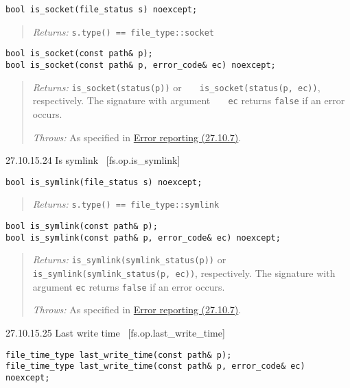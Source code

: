 \begin{verbatim}
bool is_socket(file_status s) noexcept;
\end{verbatim}

\begin{quote}
\emph{Returns:} \texttt{s.type()\ ==\ file\_type::socket}
\end{quote}

\begin{verbatim}
bool is_socket(const path& p);
bool is_socket(const path& p, error_code& ec) noexcept;
\end{verbatim}

\begin{quote}
\emph{Returns:} \texttt{is\_socket(status(p))} or
\texttt{\ \ \ is\_socket(status(p,\ ec))}, respectively. The signature
with argument \texttt{\ \ \ ec} returns \texttt{false} if an error
occurs.

\emph{Throws:} As specified in \hyperref[Error-reporting]{Error
reporting (27.10.7)}.
\end{quote}

27.10.15.24 Is symlink~ {[}fs.op.is\_symlink{]}

\begin{verbatim}
bool is_symlink(file_status s) noexcept;
\end{verbatim}

\begin{quote}
\emph{Returns:} \texttt{s.type()\ ==\ file\_type::symlink}
\end{quote}

\begin{verbatim}
bool is_symlink(const path& p);
bool is_symlink(const path& p, error_code& ec) noexcept;
\end{verbatim}

\begin{quote}
\emph{Returns:} \texttt{is\_symlink(symlink\_status(p))} or
\texttt{is\_symlink(symlink\_status(p,\ ec))}, respectively. The
signature with argument \texttt{ec} returns \texttt{false} if an error
occurs.

\emph{Throws:} As specified in \hyperref[Error-reporting]{Error
reporting (27.10.7)}.
\end{quote}

27.10.15.25 Last write time~ {[}fs.op.last\_write\_time{]}

\begin{verbatim}
file_time_type last_write_time(const path& p);
file_time_type last_write_time(const path& p, error_code& ec) noexcept;
\end{verbatim}

